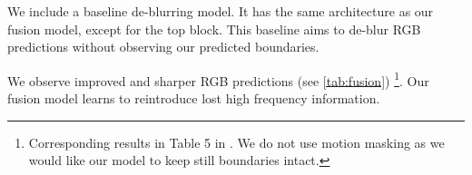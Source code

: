  We include a baseline de-blurring model. It has the same architecture as our fusion model, except for the top block. This baseline aims to de-blur RGB predictions without observing our predicted boundaries.

 We observe improved and sharper RGB predictions (see \autoref{tab:fusion}) \footnote{ Corresponding results in Table 5 in \cite{mathieu2015deep}. We do not use motion masking as we would like our model to keep still boundaries intact. }. Our fusion model learns to reintroduce lost high frequency information.